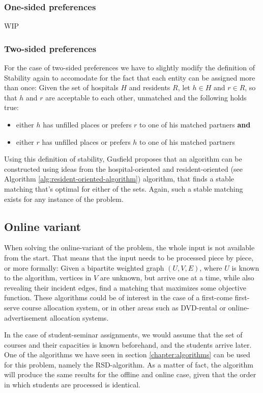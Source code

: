 \subsubsection{One-sided preferences}
WIP

\subsubsection{Two-sided preferences}
For the case of two-sided preferences we have to slightly modify the definition of Stability again to accomodate for the fact that each entity can be assigned more than once: Given the set of hospitals $H$ and residents $R$, let $h \in H$ and $r \in R$, so that $h$ and $r$ are acceptable to each other, unmatched and the following holds true: 
\begin{itemize}
    \item either $h$ has unfilled places or prefers $r$ to one of his matched partners \textbf{and}
    \item either $r$ has unfilled places or prefers $h$ to one of his matched partners
\end{itemize}
Using this definition of stability, Gusfield\cite{Gusfield} proposes that an algorithm can be constructed using ideas from the hospital-oriented and resident-oriented (see Algorithm \ref{alg:resident-oriented-algorithm}) algorithm, that finds a stable matching that's optimal for either of the sets. Again, such a stable matching exists for any instance of the problem.\cite{Gusfield}

\subsection{Online variant}
When solving the online-variant of the problem, the whole input is not available from the start. That means that the input needs to be processed piece by piece, or more formally: Given a bipartite weighted graph $(U, V, E)$, where $U$ is known to the algorithm, vertices in $V$ are unknown, but arrive one at a time, while also revealing their incident edges, find a matching that maximizes some objective function. These algorithms could be of interest in the case of a first-come first-serve course allocation system, or in other areas such as DVD-rental or online-advertisement allocation systems.\cite{Mehta:Online}

In the case of student-seminar assignments, we would assume that the set of courses and their capacities is known beforehand, and the students arrive later. One of the algorithms we have seen in section \ref{chapter:algorithms} can be used for this problem, namely the RSD-algorithm. As a matter of fact, the algorithm will produce the same results for the offline and online case, given that the order in which students are processed is identical.

